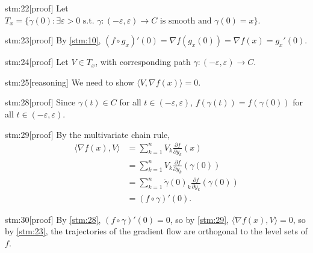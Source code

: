 \documentclass{article}
\begin{document}
\begin{stm}{stm:22}[proof]
Let $T_x = \{ \dot{\gamma}(0) : \exists \varepsilon > 0 \text{ s.t. } \gamma : (-\varepsilon, \varepsilon) \to C \text{ is smooth and } \gamma(0) = x \}$.
\end{stm}

\begin{stm}{stm:23}[proof]
By \ref{stm:10}, $(f \circ g_x)'(0) = \nabla f(g_x(0)) = \nabla f(x) = g_x'(0)$.
\end{stm}

\begin{stm}{stm:24}[proof]
Let $V \in T_x$, with corresponding path $\gamma : (-\varepsilon, \varepsilon) \to C$.
\end{stm}

\begin{stm}{stm:25}[reasoning]
We need to show $\langle V, \nabla f(x) \rangle = 0$.
\end{stm}

\begin{stm}{stm:28}[proof]
Since $\gamma(t) \in C$ for all $t \in (-\varepsilon, \varepsilon)$, $f(\gamma(t)) = f(\gamma(0))$ for all $t \in (-\varepsilon, \varepsilon)$. 
\end{stm}

\begin{stm}{stm:29}[proof]
By the multivariate chain rule,
\begin{align*}
\langle \nabla f(x), V \rangle 
&= \sum_{k=1}^n V_k \frac{\partial f}{\partial y_k}(x) \\
&= \sum_{k=1}^n V_k \frac{\partial f}{\partial y_k}(\gamma(0)) \\
&= \sum_{k=1}^n \dot{\gamma}(0)_k \frac{\partial f}{\partial y_k}(\gamma(0)) \\
&= (f \circ \gamma)'(0).
\end{align*}
\end{stm}

\begin{stm}{stm:30}[proof]
By \ref{stm:28}, $(f \circ \gamma)'(0) = 0$, so by \ref{stm:29}, $\langle \nabla f(x), V \rangle = 0$, so by \ref{stm:23}, the trajectories of the gradient flow are orthogonal to the level sets of $f$.
\end{stm}
\end{document}
